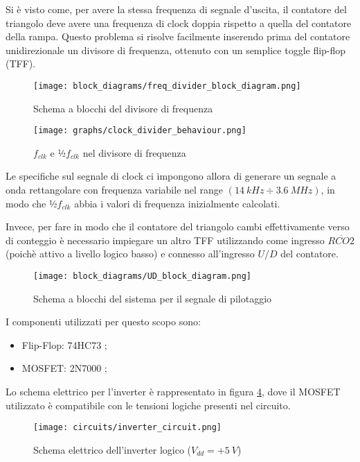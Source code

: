 Si è visto come, per avere la stessa frequenza di segnale d'uscita, il contatore del
triangolo deve avere una frequenza di clock doppia rispetto a quella del contatore della
rampa. Questo problema si risolve facilmente inserendo prima del contatore unidirezionale
un divisore di frequenza, ottenuto con un semplice toggle flip-flop (TFF).

\begin{figure}[H]
    \centering
    \texttt{[image: block\_diagrams/freq\_divider\_block\_diagram.png]}
    \caption{Schema a blocchi del divisore di frequenza}
    \label{freq_divider_block_diagram}
\end{figure}

\begin{figure}[H]
    \centering
    \texttt{[image: graphs/clock\_divider\_behaviour.png]}
    \caption{$f_{clk}$ e ½$f_{clk}$ nel divisore di frequenza}
    \label{clock_divider_behaviour}
\end{figure}

Le specifiche sul segnale di clock ci impongono allora di generare un segnale a onda rettangolare
con frequenza variabile nel range $(14\ kHz\div3.6\ MHz)$, in modo che ½$f_{clk}$ abbia
i valori di frequenza inizialmente calcolati.

Invece, per fare in modo che il contatore del triangolo cambi effettivamente verso di conteggio
è necessario impiegare un altro TFF utilizzando come ingresso $\overline{RCO2}$ (poichè
attivo a livello logico basso) e connesso all'ingresso $U/D$ del contatore.

\begin{figure}[H]
    \centering
    \texttt{[image: block\_diagrams/UD\_block\_diagram.png]}
    \caption{Schema a blocchi del sistema per il segnale di pilotaggio}
    \label{UD_block_diagram}
\end{figure}

I componenti utilizzati per questo scopo sono:

\begin{itemize}
    \item Flip-Flop: 74HC73 \cite{74hc73};
    \item MOSFET: 2N7000 \cite{2n7000};
\end{itemize}

Lo schema elettrico per l'inverter è rappresentato in figura \ref{inverter_circuit}, dove
il MOSFET utilizzato è compatibile con le tensioni logiche presenti nel circuito.

\begin{figure}[H]
    \centering
    \texttt{[image: circuits/inverter\_circuit.png]}
    \caption{Schema elettrico dell'inverter logico ($V_{dd}=+5\ V$)}
    \label{inverter_circuit}
\end{figure}


